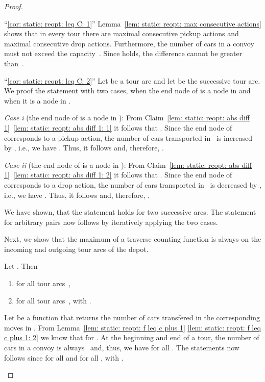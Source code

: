 \documentclass[english]{llncs}
\numberwithin{sublemma}{lemma}
\begin{document}
\begin{proof}
\begin{subproof}
``\ref{cor: static: reopt: leq C: 1}''
Lemma~\ref{lem: static: reopt: max consecutive actions} shows that in every tour there are maximal  consecutive pickup actions and maximal  consecutive drop actions.
Furthermore, the number of cars in a convoy must not exceed the capacity~.
Since  holds, the difference cannot be greater than~.


``\ref{cor: static: reopt: leq C: 2}''
Let  be a tour arc and let  be the successive tour arc.
We proof the statement with two cases, when the end node of  is a node in  and when it is a node in .

\textit{Case i} (the end node of  is a node in ):
From Claim~\ref{lem: static: reopt: abs diff 1}~\ref{lem: static: reopt: abs diff 1: 1} it follows that .
Since the end node of  corresponds to a pickup action, the number of cars transported in~ is increased by , i.e., we have .
Thus, it follows  and, therefore, .

\textit{Case ii} (the end node of  is a node in ):
From Claim~\ref{lem: static: reopt: abs diff 1}~\ref{lem: static: reopt: abs diff 1: 2} it follows that .
Since the end node of  corresponds to a drop action, the number of cars transported in~ is decreased by , i.e., we have .
Thus, it follows  and, therefore, .

We have shown, that the statement holds for two successive arcs.
The statement for arbitrary pairs now follows by iteratively applying the two cases.
\end{subproof}



Next, we show that the maximum of a traverse counting function is always on the incoming and outgoing tour arcs of the depot.



\begin{sublemma}
\label{cor: static: reopt: f geq f and f gt f}
  Let .
  Then 
  \begin{enumerate}
  \item  for all tour arcs~,
  \item  for all tour arcs~, with .
  \end{enumerate}
\end{sublemma}



\begin{subproof}
Let  be a function that returns the number of cars transfered in the corresponding moves in .
From Lemma~\ref{lem: static: reopt: f leq c plus 1} \ref{lem: static: reopt: f leq c plus 1: 2} we know that  for .
At the beginning and end of a tour, the number of cars in a convoy is always~ and, thus, we have  for all .
The statements now follows since  for all  and  for all , with .
\end{subproof}




\end{proof}
\end{document}
